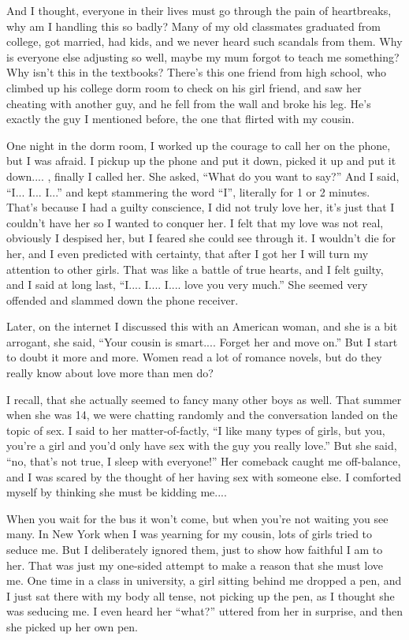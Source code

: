\documentclass[12pt]{report}
\begin{document}
{And I thought, everyone in their lives must go through the pain of heartbreaks, why am I handling this so badly?  Many of my old classmates graduated from college, got married, had kids, and we never heard such scandals from them.  Why is everyone else adjusting so well, maybe my mum forgot to teach me something?  Why isn't this in the textbooks?  There's this one friend from high school, who climbed up his college dorm room to check on his girl friend, and saw her cheating with another guy, and he fell from the wall and broke his leg.  He's exactly the guy I mentioned before, the one that flirted with my cousin.

One night in the dorm room, I worked up the courage to call her on the phone, but I was afraid.  I pickup up the phone and put it down, picked it up and put it down.... , finally I called her.  She asked, ``What do you want to say?''  And I said, ``I... I... I...'' and kept stammering the word ``I'', literally for 1 or 2 minutes.  That's because I had a guilty conscience, I did not truly love her, it's just that I couldn't have her so I wanted to conquer her.  I felt that my love was not real, obviously I despised her, but I feared she could see through it.  I wouldn't die for her, and I even predicted with certainty, that after I got her I will turn my attention to other girls.  That was like a battle of true hearts, and I felt guilty, and I said at long last, ``I.... I.... I.... love you very much.''  She seemed very offended and slammed down the phone receiver.

Later, on the internet I discussed this with an American woman, and she is a bit arrogant, she said, ``Your cousin is smart.... Forget her and move on.''  But I start to doubt it more and more.  Women read a lot of romance novels, but do they really know about love more than men do?

I recall, that she actually seemed to fancy many other boys as well.  That summer when she was 14, we were chatting randomly and the conversation landed on the topic of sex.  I said to her matter-of-factly, ``I like many types of girls, but you, you're a girl and you'd only have sex with the guy you really love.''  But she said, ``no, that's not true, I sleep with everyone!''  Her comeback caught me off-balance, and I was scared by the thought of her having sex with someone else.  I comforted myself by thinking she must be kidding me....

When you wait for the bus it won't come, but when you're not waiting you see many.  In New York when I was yearning for my cousin, lots of girls tried to seduce me.  But I deliberately ignored them, just to show how faithful I am to her.  That was just my one-sided attempt to make a reason that she must love me.  One time in a class in university, a girl sitting behind me dropped a pen, and I just sat there with my body all tense, not picking up the pen, as I thought she was seducing me.  I even heard her ``what?'' uttered from her in surprise, and then she picked up her own pen.
}
\end{document}
